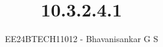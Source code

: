 \documentclass[journal]{IEEEtran}
\begin{document}

\vspace{3cm}

\title{10.3.2.4.1}
\author{EE24BTECH11012 - Bhavanisankar G S}
{\let\newpage\relax\maketitle}

\renewcommand{\thefigure}{\theenumi}
\renewcommand{\thetable}{\theenumi}
\setlength{\intextsep}{10pt} %


\renewcommand{\thetable}{\theenumi}
\end{document}
